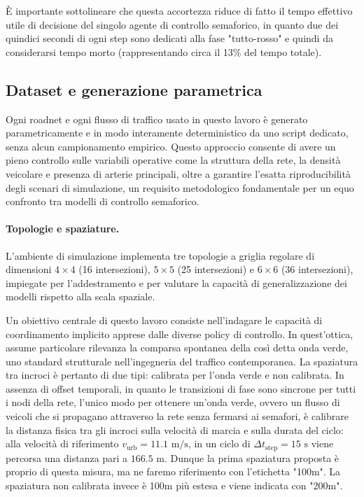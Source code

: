 È importante sottolineare che questa accortezza riduce di fatto il tempo effettivo utile di decisione del singolo agente di controllo semaforico, in quanto due dei quindici secondi di ogni step sono
dedicati alla fase "tutto-rosso" e quindi da considerarsi tempo morto (rappresentando circa il 13\% del tempo totale).

\subsection{Dataset e generazione parametrica}
\label{subsec:dataset}

Ogni roadnet e ogni flusso di traffico usato in questo lavoro è generato
parametricamente e in modo interamente deterministico da uno script dedicato,
senza alcun campionamento empirico.
Questo approccio consente di avere un pieno controllo sulle variabili operative come la
struttura della rete, la densità veicolare e presenza di arterie principali, oltre a
garantire l'esatta riproducibilità degli scenari di simulazione, un requisito metodologico fondamentale
per un equo confronto tra modelli di controllo semaforico.

\paragraph{Topologie e spaziature.}
L'ambiente di simulazione implementa tre topologie a griglia regolare di dimensioni $4\times4$ (16 intersezioni),
$5\times5$ (25 intersezioni) e $6\times6$ (36 intersezioni), impiegate per l'addestramento e per valutare la capacità di generalizzazione
dei modelli rispetto alla scala spaziale.

Un obiettivo centrale di questo lavoro consiste nell'indagare le capacità di coordinamento
implicito apprese dalle diverse policy di controllo. In quest'ottica, assume particolare
rilevanza la comparsa spontanea della così detta onda verde, uno standard strutturale nell'ingegneria del traffico contemporanea.
La spaziatura tra incroci è pertanto di due tipi: calibrata per l'onda verde e non calibrata.
In assenza di offset temporali, in quanto le transizioni di fase sono sincrone per tutti i nodi della rete,
l'unico modo per ottenere un'onda verde, ovvero un flusso di veicoli che si propagano
attraverso la rete senza fermarsi ai semafori, è calibrare la distanza fisica tra
gli incroci sulla velocità di marcia e sulla durata del ciclo:
alla velocità di riferimento $v_{\mathrm{urb}} = 11.1 \text{ m/s}$,
in un ciclo di $\Delta t_{\text{step}} = 15 \text{ s}$ viene percorsa una distanza pari a $166.5 \text{ m}$.
Dunque la prima spaziatura proposta è proprio di questa misura, ma ne faremo
riferimento con l'etichetta "100m".
La spaziatura non calibrata invece è 100m più estesa e viene indicata con "200m".

